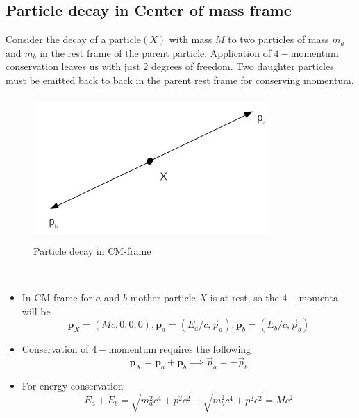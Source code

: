 \subsection{Particle decay in Center of mass frame}
Consider the decay of a particle$(X)$ with mass $M$ to two particles of mass $m_{a}$ and $m_{b}$ in the rest frame of the parent particle. 
Application of $4-$momentum conservation leaves us with just $2$ degrees of freedom. Two daughter particles must be emitted back
to back in the parent rest frame for conserving momentum.
\begin{figure}[h]
    \centering
    \includegraphics[width = 9cm, height = 5.5cm]{cm3.png}
    \caption{Particle decay in CM-frame}
    \label{fig:my_label}
\end{figure}
\hspace{10pt}
\\
\begin{itemize}
    \item 
In CM frame for $a$ and $b$ mother particle $X$ is at rest, so the $4-$momenta will be 
        \begin{equation}
            \textbf{p}_{X} = (M c,0,0,0), \textbf{p}_{a}= (E_{a}/c, \Vec{p}_{a}), \textbf{p}_{b}= (E_{b}/c, \Vec{p}_{b})
        \end{equation}
\item        
 Conservation of $4-$momentum requires the following 
\begin{equation}
    \textbf{p}_{X} = \textbf{p}_{a} + \textbf{p}_{b} \implies \Vec{p}_a = -\Vec{p}_b
\end{equation}    
        
\item    
 For energy conservation 
 \begin{equation}
     E_{a}+E_{b} = \sqrt{m_{a}^2c^4+p^2c^2}+ \sqrt{m_{b}^2c^4+p^2c^2} =M c^2
 \end{equation}

\end{itemize}

